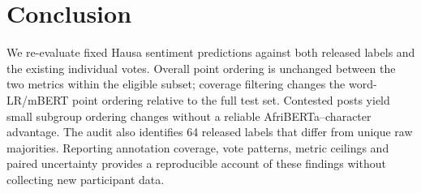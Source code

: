 \documentclass[conference]{IEEEtran}
\begin{document}
\section{Conclusion}
We re-evaluate fixed Hausa sentiment predictions against both released labels
and the existing individual votes. Overall point ordering is unchanged between
the two metrics within the eligible subset; coverage filtering changes the
word-LR/mBERT point ordering relative to the full test set.
Contested posts yield small subgroup ordering changes without a reliable
AfriBERTa--character advantage. The audit also identifies 64 released labels
that differ from unique raw majorities. Reporting annotation coverage, vote
patterns, metric ceilings and paired uncertainty provides a reproducible
account of these findings without collecting new participant data.
\end{document}
